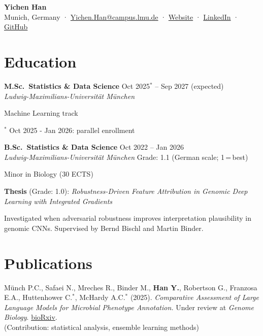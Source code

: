 \documentclass[a4paper,11pt]{article}
\newcommand{\entry}[4]{%
  \textbf{#1} \hfill #2\\
  \textit{#3} \hfill #4\par
}
\newenvironment{details}{%
  \begin{list}{}{%
    \setlength{\leftmargin}{1.5em}%
    \setlength{\rightmargin}{0pt}%
    \setlength{\topsep}{0.1em}%
    \setlength{\parsep}{0.2em}%
    \setlength{\itemsep}{0pt}%
  }%
  \item[]%
}{%
  \end{list}%
}
\begin{document}
\thispagestyle{empty}

\begin{center}
  {\LARGE\bfseries Yichen Han}\\[8pt]
  {\small
    Munich, Germany \enspace·\enspace
    \href{mailto:Yichen.Han@campus.lmu.de}{Yichen.Han@campus.lmu.de} \enspace·\enspace
    \href{https://yhan228.github.io/}{Website} \enspace·\enspace
    \href{https://www.linkedin.com/in/yichen-han-865092258/}{LinkedIn} \enspace·\enspace
    \href{https://github.com/YHan228}{GitHub}
  }
\end{center}

\vspace{0.8em}

\section*{Education}

\entry{M.Sc.\ Statistics \& Data Science}{Oct 2025$^*$ -- Sep 2027 (expected)}
      {Ludwig-Maximilians-Universität München}{}
\begin{details}
Machine Learning track

\vspace{0.2em}
{\footnotesize $^*$ Oct 2025 - Jan 2026: parallel enrollment}
\end{details}

\entry{B.Sc.\ Statistics \& Data Science}{Oct 2022 -- Jan 2026}
      {Ludwig-Maximilians-Universität München}{Grade: 1.1 (German scale; 1\,=\,best)}
\begin{details}
Minor in Biology (30 ECTS)

\textbf{Thesis} (Grade: 1.0): \emph{Robustness-Driven Feature Attribution in Genomic Deep Learning with Integrated Gradients}

Investigated when adversarial robustness improves interpretation plausibility in genomic CNNs. Supervised by Bernd Bischl and Martin Binder.
\end{details}

\section*{Publications}

Münch P.C., Safaei N., Mreches R., Binder M., \textbf{Han Y.}, Robertson G., Franzosa E.A., Huttenhower C.$^*$, McHardy A.C.$^*$ (2025).
\emph{Comparative Assessment of Large Language Models for Microbial Phenotype Annotation.}
Under review at \textit{Genome Biology}. \href{https://doi.org/10.1101/2025.11.24.690272}{bioRxiv}.\\
{\small (Contribution: statistical analysis, ensemble learning methods)}
\end{document}
